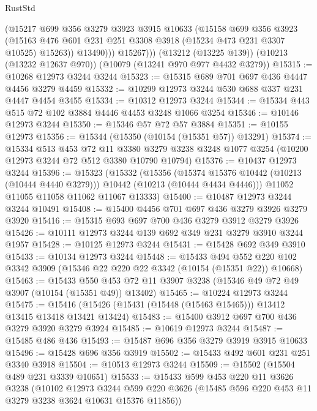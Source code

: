 \begin{lexlean}{RustStd}
\begin{coremodule}
              (@15217
                @699
                @356
                @3279
                @3923
                @3915
                @10633
                (@15158
                  @699
                  @356
                  @3923
                  (@15163 @476 @601 @231 @251 @3308 @3918 (@15234 @473 @231 @3307 @10525) @15263))
                @13490)))
          @15267)))
    (@13212 (@13225 @139))
    (@10213 (@13232 @12637 @970))
    (@10079 (@13241 @970 @977 @4432 @3279))
@15315 := @10268 @12973 @3244 @3244
@15323 := @15315 @689 @701 @697 @436 @4447 @4456 @3279 @4459
@15332 := @10299 @12973 @3244 @530 @688 @337 @231 @4447 @4454 @3455
@15334 := @10312 @12973 @3244
@15344 := @15334 @443 @515 @72 @102 @3884 @4446 @4453 @3248 @1066 @3254
@15346 := @10146 @12973 @3244
@15350 := @15346 @57 @72 @57 @3884
@15351 := @10155 @12973
@15356 := @15344 (@15350 (@10154 (@15351 @57)) @13291)
@15374 := @15334
    @513
    @453
    @72
    @11
    @3380
    @3279
    @3238
    @3248
    @1077
    @3254
    (@10200 @12973 @3244 @72 @512 @3380 @10790 @10794)
@15376 := @10437 @12973 @3244
@15396 := @15323
    (@15332
      (@15356
        (@15374 @15376 @10442 (@10213 (@10444 @4440 @3279)))
        @10442
        (@10213 (@10444 @4434 @4446)))
      @11052
      @11055
      @11058
      @11062
      @11067
      @13333)
@15400 := @10487 @12973 @3244 @3244 @10491
@15408 := @15400 @4456 @701 @697 @436 @3279 @3926 @3279 @3920
@15416 := @15315 @693 @697 @700 @436 @3279 @3912 @3279 @3926
@15426 := @10111 @12973 @3244 @139 @692 @349 @231 @3279 @3910 @3244 @1957
@15428 := @10125 @12973 @3244
@15431 := @15428 @692 @349 @3910
@15433 := @10134 @12973 @3244
@15448 := @15433
    @494
    @552
    @220
    @102
    @3342
    @3909
    (@15346 @22 @220 @22 @3342 (@10154 (@15351 @22)) @10668)
@15463 := @15433
    @550
    @453
    @72
    @11
    @3907
    @3238
    (@15346 @49 @72 @49 @3907 (@10154 (@15351 @49)) @13402)
@15465 := @10224 @12973 @3244
@15475 := @15416 (@15426 (@15431 (@15448 (@15463 @15465))) @13412 @13415 @13418 @13421 @13424)
@15483 := @15400 @3912 @697 @700 @436 @3279 @3920 @3279 @3924
@15485 := @10619 @12973 @3244
@15487 := @15485 @486 @436
@15493 := @15487 @696 @356 @3279 @3919 @3915 @10633
@15496 := @15428 @696 @356 @3919
@15502 := @15433 @492 @601 @231 @251 @3340 @3918
@15504 := @10513 @12973 @3244
@15509 := @15502 (@15504 @489 @231 @3339 @10651)
@15533 := @15433
    @599
    @453
    @220
    @11
    @3626
    @3238
    (@10102
      @12973
      @3244
      @599
      @220
      @3626
      (@15485 @596 @220 @453 @11 @3279 @3238 @3624 @10631 @15376 @11856))

\end{coremodule}
\end{lexlean}
